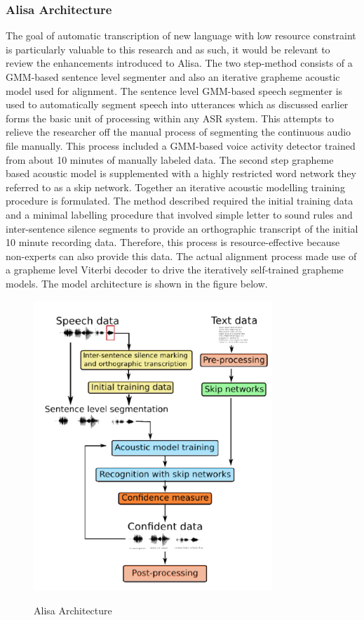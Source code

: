 \subsubsection{Alisa Architecture}
The goal of automatic transcription of new language with low resource constraint is particularly valuable to this research and as such, it would be relevant to review the enhancements introduced to Alisa.  The two step-method consists of a GMM-based sentence level segmenter and also an iterative grapheme acoustic model used for alignment.  The sentence level GMM-based speech segmenter is used to automatically segment speech into utterances which as discussed earlier forms the basic unit of processing within any ASR system.  This attempts to relieve the researcher off the manual process of segmenting the continuous audio file manually. This process included a GMM-based voice activity detector trained from about 10 minutes of manually labeled data. The second step grapheme based acoustic model is supplemented with a highly restricted word network they referred to as a skip network.  Together an iterative acoustic modelling training procedure is formulated.  The method described required the initial training data and a minimal labelling procedure that involved simple letter to sound rules and inter-sentence silence segments to provide an orthographic transcript of the initial 10 minute recording data.  Therefore, this process is resource-effective because non-experts can also provide this data.  The actual alignment process made use of a grapheme level Viterbi decoder to drive the iteratively self-trained grapheme models.  The model architecture is shown in the figure below.
\begin{figure}
\centering
  \includegraphics[width=9cm]{thesis/images/alisa}\\
  \caption{Alisa Architecture\citep{stan2016alisa}}\label{fig_c3_alisa00}
\end{figure}

